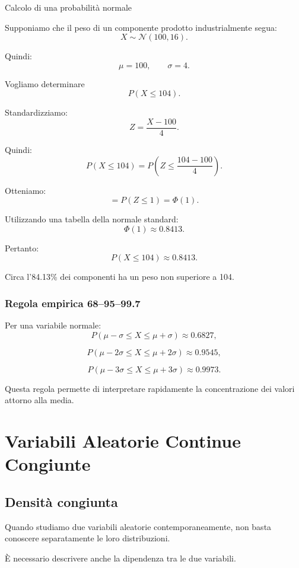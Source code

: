 \begin{example}{Calcolo di una probabilità normale}

Supponiamo che il peso
di un componente prodotto
industrialmente segua:
\[
X\sim\mathcal{N}(100,16).
\]

Quindi:
\[
\mu=100,
\qquad
\sigma=4.
\]

Vogliamo determinare
\[
P(X\leq104).
\]

Standardizziamo:
\[
Z=\frac{X-100}{4}.
\]

Quindi:
\[
P(X\leq104)
=
P\left(
Z\leq\frac{104-100}{4}
\right).
\]

Otteniamo:
\[
=P(Z\leq1)=\Phi(1).
\]

Utilizzando una tabella
della normale standard:
\[
\Phi(1)\approx0.8413.
\]

Pertanto:
\[
\boxed{
P(X\leq104)\approx0.8413.
}
\]

Circa l'84.13\% dei componenti
ha un peso non superiore a 104.
\end{example}

\subsubsection{Regola empirica 68--95--99.7}

Per una variabile normale:
\[
P(\mu-\sigma\leq X\leq\mu+\sigma)
\approx0.6827,
\]

\[
P(\mu-2\sigma\leq X\leq\mu+2\sigma)
\approx0.9545,
\]

\[
P(\mu-3\sigma\leq X\leq\mu+3\sigma)
\approx0.9973.
\]

Questa regola permette
di interpretare rapidamente
la concentrazione dei valori
attorno alla media.







\section{Variabili Aleatorie Continue Congiunte}

\subsection{Densità congiunta}

Quando studiamo due variabili
aleatorie contemporaneamente,
non basta conoscere separatamente
le loro distribuzioni.

È necessario descrivere
anche la dipendenza
tra le due variabili.

